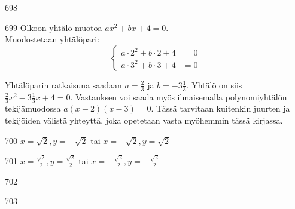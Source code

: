 \begin{Vastaus}{698}
    
\end{Vastaus}
\begin{Vastaus}{699}
		Olkoon yhtälö muotoa $ax^2+bx+4=0$. \\
      Muodostetaan yhtälöpari:
      \[
        \left\{
          \begin{aligned}
            a\cdot 2^2 + b\cdot 2 + 4 &= 0 \\
            a\cdot 3^2 + b\cdot 3 + 4 &= 0
          \end{aligned}
        \right.
      \]

      Yhtälöparin ratkaisuna saadaan $a=\frac23$ ja $b=-3\frac13$. Yhtälö on siis $\frac{2}{3}x^2-3\frac{1}{3}x+4=0$. Vastauksen voi saada myös ilmaisemalla polynomiyhtälön tekijämuodossa $a(x-2)(x-3)=0$. Tässä tarvitaan kuitenkin juurten ja tekijöiden välistä yhteyttä, joka opetetaan vasta myöhemmin tässä kirjassa.
    
\end{Vastaus}
\begin{Vastaus}{700}
        $x=\sqrt{2}, y=-\sqrt{2}$ tai $x=-\sqrt{2}, y=\sqrt{2}$
    
\end{Vastaus}
\begin{Vastaus}{701}
        $x=\frac{\sqrt{2}}{2}, y=\frac{\sqrt{2}}{2}$ tai $x=-\frac{\sqrt{2}}{2}, y=-\frac{\sqrt{2}}{2}$
    
\end{Vastaus}
\begin{Vastaus}{702}
    
\end{Vastaus}
\begin{Vastaus}{703}
    
\end{Vastaus}
